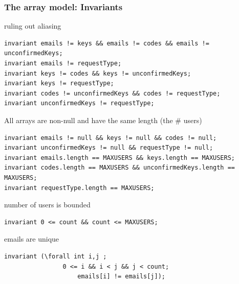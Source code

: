 \documentclass{beamer}
\begin{document}
\begin{frame}[fragile]
    \frametitle{The array model: Invariants}
    
  \begin{block}{\small ruling out aliasing}
    \begin{lstlisting}
invariant emails != keys && emails != codes && emails != unconfirmedKeys;
invariant emails != requestType;
invariant keys != codes && keys != unconfirmedKeys;
invariant keys != requestType;
invariant codes != unconfirmedKeys && codes != requestType;
invariant unconfirmedKeys != requestType;\end{lstlisting}
  \end{block}
  \vspace{-1em}
  \begin{block}{\small All arrays are non-null and have the same length (the # users)}
\begin{lstlisting}
invariant emails != null && keys != null && codes != null;
invariant unconfirmedKeys != null && requestType != null;
invariant emails.length == MAXUSERS && keys.length == MAXUSERS;
invariant codes.length == MAXUSERS && unconfirmedKeys.length == MAXUSERS;
invariant requestType.length == MAXUSERS;\end{lstlisting}
  \end{block}
  \vspace{-1em}
  \begin{block}{\small number of users is bounded}
\begin{lstlisting}
invariant 0 <= count && count <= MAXUSERS;\end{lstlisting}
  \end{block}
  \vspace{-1em}
\begin{block}{\small emails are unique}
\begin{lstlisting}  
invariant (\forall int i,j ; 
                0 <= i && i < j && j < count; 
                    emails[i] != emails[j]);\end{lstlisting}
  \end{block}
\end{frame}
\end{document}
